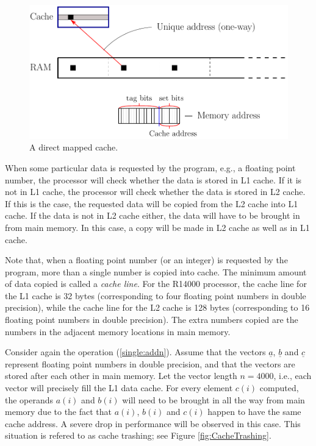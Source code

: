 \documentclass[11pt]{article}
\begin{document}
\begin{figure}[htbp]
  \begin{center}
    \includegraphics[scale=0.85]{DirectMappedCache}
  \end{center}
  \caption{A direct mapped cache. 
}
\label{fig:DirectMappedCache}
\end{figure}

When some particular data is requested by the program, e.g., a floating point number,
the processor will check whether the data is stored in L1 cache. 
If it is not in L1 cache, the processor will check whether the data is stored in 
L2 cache. If this is the case, the requested data will be copied from the L2 cache 
into L1 cache. If the data is not in L2 cache either, the data will have to be brought 
in from main memory. In this case, a copy will be made in L2 cache as well as 
in L1 cache. 

Note that, when a floating point number (or an integer) is requested by 
the program, more than a single number is copied into cache. 
The minimum amount of data copied is called a {\em cache line}. 
For the R14000 processor, the cache line for the L1 cache is 32 bytes
(corresponding to four floating point numbers in double precision), 
while the cache line for the L2 cache is 128 bytes 
(corresponding to 16 floating point numbers in double precision). 
The extra numbers copied are the numbers in the adjacent memory 
locations in main memory.  

Consider again the operation (\ref{single:addn}). Assume that the 
vectors $\underline{a}$, $\underline{b}$ and $\underline{c}$ represent 
floating point numbers in double precision, and that the vectors are 
stored after each other in main memory. Let the vector length $n=4000$, 
i.e., each vector will precisely fill the L1 data cache. 
For every element $c(i)$ computed, the operands $a(i)$ and $b(i)$ 
will need to be brought in all the way from main memory due to the fact 
that $a(i)$, $b(i)$ and $c(i)$ happen to have the same cache address. 
A severe drop in performance will be observed in this case. 
This situation is refered to as cache trashing; see Figure \ref{fig:CacheTrashing}.
\vspace{.5cm}
\end{document}
